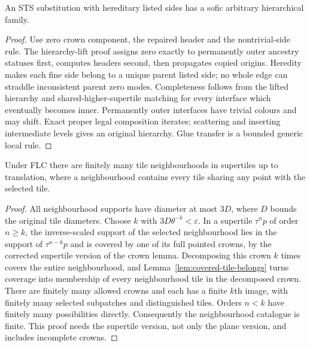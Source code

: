 \begin{theorem}\label{thm:hereditary-hierarchy}
An STS substitution with hereditary listed sides has a sofic arbitrary
hierarchical family.
\end{theorem}
\begin{proof}
Use zero crown component, the repaired header and the nontrivial-side rule.
The hierarchy-lift proof assigns zero exactly to permanently outer ancestry
statuses first, computes headers second, then propagates copied origins.
Heredity makes each fine side belong to a unique parent listed side; no
whole edge can straddle inconsistent parent zero modes.
Completeness follows from the lifted hierarchy and shared-higher-supertile
matching for every interface which eventually becomes inner. Permanently
outer interfaces have trivial colours and may shift. Exact proper legal
composition iterates; scattering and inserting intermediate levels gives
an original hierarchy. Glue transfer is a bounded generic local rule.
\end{proof}

\begin{lemma}\label{lem:finite-neighbourhoods}
Under FLC there are finitely many tile neighbourhoods in supertiles up to
translation, where a neighbourhood contains every tile sharing any point
with the selected tile.
\end{lemma}
\begin{proof}
All neighbourhood supports have diameter at most $3D$, where $D$ bounds
the original tile diameters. Choose $k$ with
$3D\theta^{-k}<\varepsilon$. In a supertile $\tau^n p$ of order $n\geq k$,
the inverse-scaled support of the selected neighbourhood lies in the
support of $\tau^{n-k}p$ and is covered by one of its full pointed crowns,
by the corrected supertile version of the crown lemma. Decomposing this
crown $k$ times covers the entire neighbourhood, and
Lemma~\ref{lem:covered-tile-belongs} turns coverage into membership of
every neighbourhood tile in the decomposed crown. There are finitely many
allowed crowns and each has a finite $k$th image, with finitely many
selected subpatches and distinguished tiles. Orders $n<k$ have finitely
many possibilities directly. Consequently the neighbourhood catalogue is
finite.
This proof needs the supertile version, not only the plane version, and
includes incomplete crowns.
\end{proof}

